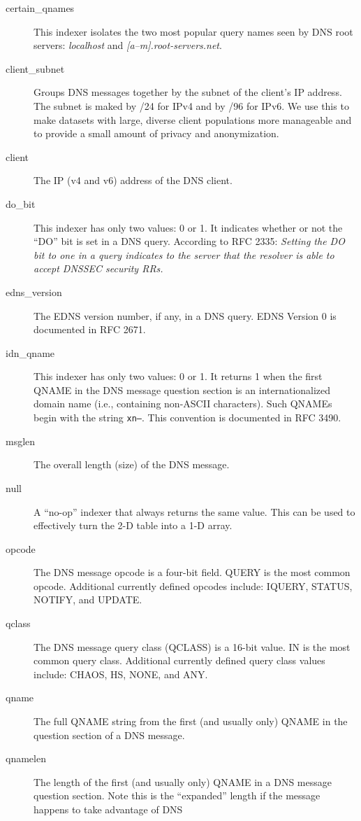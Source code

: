 \documentclass{report}
\begin{document}
\begin{description}
\item[certain\_qnames]
	This indexer isolates the two most popular query names seen
	by DNS root servers: {\em localhost\/} and {\em
	[a--m].root-servers.net\/}.
\item[client\_subnet]
	Groups DNS messages together by the subnet of the
	client's IP address.  The subnet is maked by /24 for IPv4
	and by /96 for IPv6.  We use this to make datasets with
	large, diverse client populations more manageable and to
	provide a small amount of privacy and anonymization.
\item[client]
	The IP (v4 and v6) address of the DNS client.
\item[do\_bit]
	This indexer has only two values: 0 or 1.  It indicates
	whether or not the ``DO'' bit is set in a DNS query.  According to
	RFC 2335: {\em Setting the DO bit to one in a query indicates
	to the server that the resolver is able to accept DNSSEC
	security RRs.}
\item[edns\_version]
	The EDNS version number, if any, in a DNS query.  EDNS
	Version 0 is documented in RFC 2671.
\item[idn\_qname]
	This indexer has only two values: 0 or 1.  It returns 1
	when the first QNAME in the DNS message question section
	is an internationalized domain name (i.e., containing
	non-ASCII characters).  Such QNAMEs begin with the string
	{\tt xn--\/}.  This convention is documented in RFC 3490.
\item[msglen]
	The overall length (size) of the DNS message.
\item[null]
	A ``no-op'' indexer that always returns the same value.
	This can be used to effectively turn the 2-D table into a
	1-D array.
\item[opcode]
	The DNS message opcode is a four-bit field.  QUERY is the
	most common opcode.  Additional currently defined opcodes
	include: IQUERY, STATUS, NOTIFY, and UPDATE.
\item[qclass]
	The DNS message query class (QCLASS) is a 16-bit value.  IN
	is the most common query class.  Additional currently defined
	query class values include: CHAOS, HS, NONE, and ANY.
\item[qname]
	The full QNAME string from the first (and usually only)
	QNAME in the question section of a DNS message.
\item[qnamelen]
	The length of the first (and usually only) QNAME in a DNS
	message question section.  Note this is the ``expanded''
	length if the message happens to take advantage of DNS

\end{description}
\end{document}
